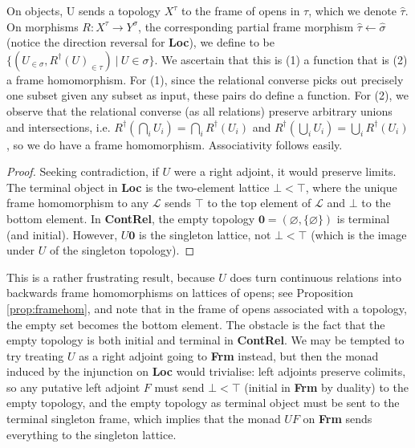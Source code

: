 \begin{defn}
On objects, U sends a topology $X^\tau$ to the frame of opens in $\tau$, which we denote $\hat{\tau}$.\\
On morphisms $R: X^\tau \rightarrow Y^\sigma$, the corresponding partial frame morphism $\hat{\tau} \leftarrow \hat{\sigma}$ (notice the direction reversal for \textbf{Loc}), we define to be $\{(U_{\in \sigma},R^\dagger(U)_{\in \tau}) \ | \ U \in \sigma\}$. We ascertain that this is (1) a function that is (2) a frame homomorphism. For (1), since the relational converse picks out precisely one subset given any subset as input, these pairs do define a function. For (2), we observe that the relational converse (as all relations) preserve arbitrary unions and intersections, i.e. $R^\dagger(\bigcap\limits_i U_i) = \bigcap\limits_i R^\dagger(U_i)$ and $R^\dagger(\bigcup\limits_i U_i) = \bigcup\limits_i R^\dagger(U_i)$, so we do have a frame homomorphism. Associativity follows easily.
\end{defn}

\begin{proposition}
\begin{proof}
Seeking contradiction, if $U$ were a right adjoint, it would preserve limits. The terminal object in \textbf{Loc} is the two-element lattice $\bot < \top$, where the unique frame homomorphism to any $\mathcal{L}$ sends $\top$ to the top element of $\mathcal{L}$ and $\bot$ to the bottom element. In \textbf{ContRel}, the empty topology $\textbf{0} = (\varnothing, \{\varnothing\})$ is terminal (and initial). However, $U\textbf{0}$ is the singleton lattice, not $\bot < \top$ (which is the image under $U$ of the singleton topology).
\end{proof}
\end{proposition}

This is a rather frustrating result, because $U$ does turn continuous relations into backwards frame homomorphisms on lattices of opens; see Proposition \ref{prop:framehom}, and note that in the frame of opens associated with a topology, the empty set becomes the bottom element. The obstacle is the fact that the empty topology is both initial and terminal in \textbf{ContRel}. We may be tempted to try treating $U$ as a right adjoint going to \textbf{Frm} instead, but then the monad induced by the injunction on \textbf{Loc} would trivialise: left adjoints preserve colimits, so any putative left adjoint $F$ must send $\bot < \top$ (initial in \textbf{Frm} by duality) to the empty topology, and the empty topology as terminal object must be sent to the terminal singleton frame, which implies that the monad $UF$ on \textbf{Frm} sends everything to the singleton lattice.

